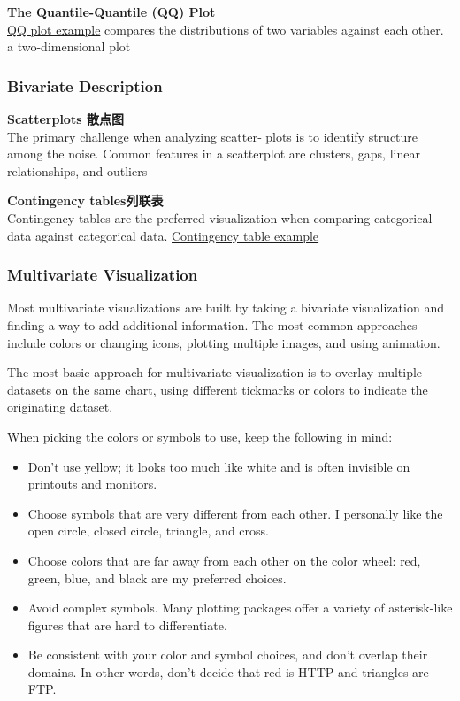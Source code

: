 \documentclass{article}
\begin{document}
\textbf{The Quantile-Quantile (QQ) Plot}\\
\href{https://onlinecourses.science.psu.edu/stat414/sites/onlinecourses.science.psu.edu.stat414/files/lesson15/plot\_01.gif}{QQ plot example}
compares the distributions of two variables against each
other.  
a two-dimensional plot

\subsubsection{Bivariate Description}
\textbf{Scatterplots 散点图}\\
The primary challenge when analyzing scatter‐
plots is to identify structure among the noise. Common features in a scatterplot are
clusters, gaps, linear relationships, and outliers

\textbf{Contingency tables列联表}\\
Contingency tables are the preferred visualization when comparing categorical data
against categorical data.
\href{http://upload.wikimedia.org/wikipedia/commons/9/94/Contingency\_table.png}{Contingency table example}

\subsubsection{Multivariate Visualization}
Most multivariate visualizations are built by taking a bivariate visualization and finding a way
to add additional information. The most common approaches include colors or changing icons, plotting multiple images, and using animation.

The most basic approach for multivariate visualization is to overlay multiple datasets
on the same chart, using different tickmarks or colors to indicate the originating dataset.

\bigskip
When picking the colors or symbols to use, keep the following in mind:

\begin{itemize}
\item Don't use yellow; it looks too much like white and is often invisible on printouts and monitors.
\item Choose symbols that are very different from each other. I personally like the open circle, closed circle, triangle, and cross.
\item Choose colors that are far away from each other on the color wheel: red, green, blue, and black are my preferred choices.
\item Avoid complex symbols. Many plotting packages offer a variety of asterisk-like figures that are hard to differentiate.
\item Be consistent with your color and symbol choices, and don't overlap their domains. In other words, don't decide that red is HTTP and triangles are FTP.
\end{itemize}
\end{document}
